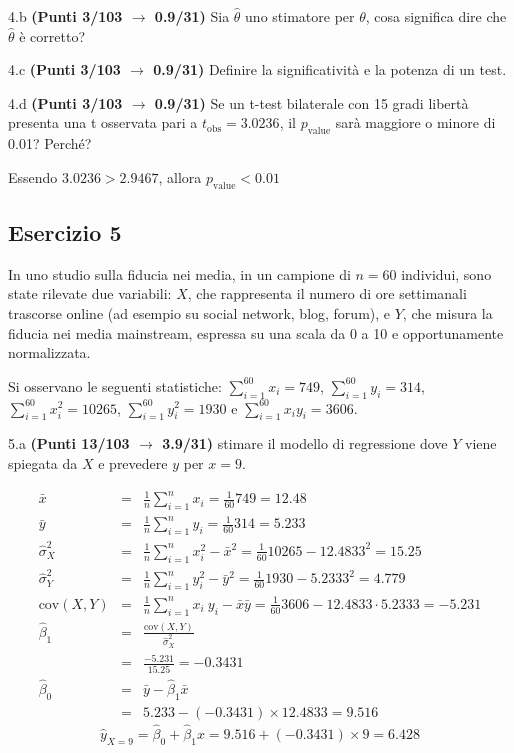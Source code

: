 \documentclass[
  11pt,
]{book}
\theoremstyle{mytheoremstyle}
\theoremstyle{mydefstyle}
\newenvironment{sol}
  {
  \begin{tcolorbox}[enhanced,breakable,arc=0.1mm,boxrule=1pt,colback=white,colframe=iblue,
  title=\bf \fontfamily{lmss}\selectfont \hspace{.5 cm} Soluzione,drop fuzzy shadow]

}{
\end{tcolorbox}
  }
\begin{document}
4.b \textbf{(Punti 3/103 \(\rightarrow\) 0.9/31)} Sia \(\hat\theta\) uno stimatore per \(\theta\), cosa significa dire che \(\hat\theta\) è corretto?

4.c \textbf{(Punti 3/103 \(\rightarrow\) 0.9/31)} Definire la significatività e la potenza di un test.

4.d \textbf{(Punti 3/103 \(\rightarrow\) 0.9/31)} Se un t-test bilaterale con 15 gradi libertà presenta una
t osservata pari a \(t_\text{obs}=3.0236\), il \(p_\text{value}\) sarà maggiore o minore di 0.01? Perché?

\begin{sol}
Essendo \(3.0236> 2.9467\), allora
\(p_\text{value}<0.01\)

\end{sol}

\subsection{Esercizio 5}\label{esercizio-5-45}

In uno studio sulla fiducia nei media, in un campione di \(n=60\) individui, sono state rilevate due variabili: \(X\), che rappresenta il numero di ore settimanali trascorse online (ad esempio su social network, blog, forum), e \(Y\), che misura la fiducia nei media mainstream, espressa su una scala da 0 a 10 e opportunamente normalizzata.

Si osservano le seguenti statistiche:
\(\sum_{i=1}^{60}x_i=749\), \(\sum_{i=1}^{60}y_i=314\),
\(\sum_{i=1}^{60}x_i^2=10265\), \(\sum_{i=1}^{60}y_i^2=1930\) e \(\sum_{i=1}^{60}x_iy_i=3606\).

5.a \textbf{(Punti 13/103 \(\rightarrow\) 3.9/31)} stimare il modello di regressione dove \(Y\) viene spiegata da \(X\) e prevedere \(y\) per \(x=9\).

\begin{sol}
\begin{eqnarray*}
           \bar x &=&\frac 1 n\sum_{i=1}^n x_i = \frac {1}{ 60 }  749 =  12.48 \\
           \bar y &=&\frac 1 n\sum_{i=1}^n y_i = \frac {1}{ 60 }  314 =  5.233 \\
           \hat\sigma_X^2&=&\frac 1 n\sum_{i=1}^n x_i^2-\bar x^2=\frac {1}{ 60 }  10265  - 12.4833 ^2= 15.25 \\
           \hat\sigma_Y^2&=&\frac 1 n\sum_{i=1}^n y_i^2-\bar y^2=\frac {1}{ 60 }  1930  - 5.2333 ^2= 4.779 \\
           \text{cov}(X,Y)&=&\frac 1 n\sum_{i=1}^n x_i~y_i-\bar x\bar y=\frac {1}{ 60 }  3606 - 12.4833 \cdot 5.2333 = -5.231 \\
           \hat\beta_1 &=& \frac{\text{cov}(X,Y)}{\hat\sigma_X^2} \\
                    &=& \frac{ -5.231 }{ 15.25 }  =  -0.3431 \\
           \hat\beta_0 &=& \bar y - \hat\beta_1 \bar x\\
                    &=&  5.233 - (-0.3431) \times  12.4833 = 9.516 
         \end{eqnarray*}\[\hat y_{X= 9 }=\hat\beta_0+\hat\beta_1 x= 9.516 + (-0.3431) \times 9 = 6.428 \]

\end{sol}
\end{document}
